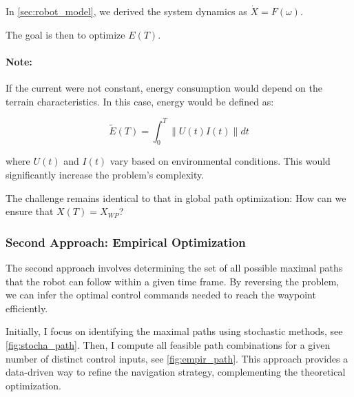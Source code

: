 \documentclass[../main.tex]{subfiles}
\begin{document}
\vspace{1em}

In \autoref{sec:robot_model}, we derived the system dynamics as $\dot{X} = F(\omega)$.

\vspace{1em}

The goal is then to optimize $E(T)$.

\vspace{1em}

\paragraph{Note:} If the current were not constant, energy consumption would depend on the terrain characteristics. In this case, energy would be defined as:

\begin{equation}
    \tilde{E}(T) = \int_{0}^{T} \| U(t) I(t) \| dt
\end{equation}

where $U(t)$ and $I(t)$ vary based on environmental conditions. This would significantly increase the problem's complexity.

The challenge remains identical to that in global path optimization: How can we ensure that $X(T) = X_{WP}$?

\subsubsection*{Second Approach: Empirical Optimization}

The second approach involves determining the set of all possible maximal paths that the robot can follow within a given time frame. By reversing the problem, we can infer the optimal control commands needed to reach the waypoint efficiently.

Initially, I focus on identifying the maximal paths using stochastic methods, see \autoref{fig:stocha_path}. Then, I compute all feasible path combinations for a given number of distinct control inputs, see \autoref{fig:empir_path}. This approach provides a data-driven way to refine the navigation strategy, complementing the theoretical optimization.
\end{document}
